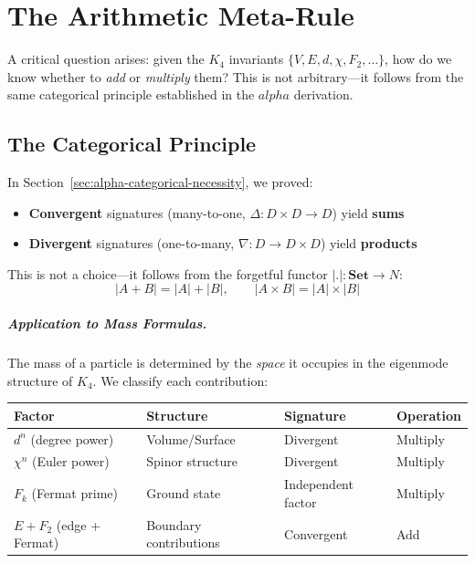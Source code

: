 \documentclass[11pt,a4paper]{book}
\def\alpha{alpha}%
\def\cdot{.}%
\def\mathbb#1{#1}%
\begin{document}
\chapter{The Arithmetic Meta-Rule}
\label{chap:arithmetic-meta-rule}

A critical question arises: given the $K_4$ invariants $\{V, E, d, \chi, F_2, \ldots\}$, 
how do we know whether to \emph{add} or \emph{multiply} them? This is not arbitrary---it 
follows from the same categorical principle established in the $\alpha$ derivation.

\section{The Categorical Principle}

In Section~\ref{sec:alpha-categorical-necessity}, we proved:
\begin{itemize}
\item \textbf{Convergent} signatures (many-to-one, $\Delta : D \times D \to D$) yield \textbf{sums}
\item \textbf{Divergent} signatures (one-to-many, $\nabla : D \to D \times D$) yield \textbf{products}
\end{itemize}

This is not a choice---it follows from the forgetful functor $|\cdot| : \mathbf{Set} \to \mathbb{N}$:
\[
|A + B| = |A| + |B|, \qquad |A \times B| = |A| \times |B|
\]

\paragraph{Application to Mass Formulas.}

The mass of a particle is determined by the \emph{space} it occupies in the eigenmode 
structure of $K_4$. We classify each contribution:

\begin{center}
\begin{tabular}{llll}
\textbf{Factor} & \textbf{Structure} & \textbf{Signature} & \textbf{Operation} \\
\hline
$d^n$ (degree power) & Volume/Surface & Divergent & Multiply \\
$\chi^n$ (Euler power) & Spinor structure & Divergent & Multiply \\
$F_k$ (Fermat prime) & Ground state & Independent factor & Multiply \\
$E + F_2$ (edge + Fermat) & Boundary contributions & Convergent & Add \\
\end{tabular}
\end{center}
\end{document}
